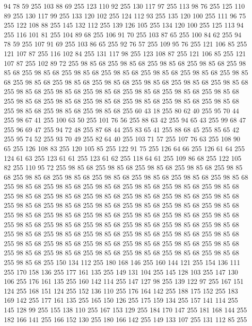 94 78 59 255 103 88 69 255 123 110 92 255 130 117 97 255 113 98 76 255 125 110 89 255 130 117 99 255 133 120 102 255 124 112 93 255 135 120 100 255 111 96 75 255 122 108 88 255 145 132 112 255 139 126 105 255 134 120 100 255 125 113 94 255 116 101 81 255 104 89 68 255 106 91 70 255 103 87 65 255 100 84 62 255 94 78 59 255 107 91 69 255 103 86 65 255 92 76 57 255 109 95 76 255 121 106 85 255 121 107 87 255 116 102 84 255 131 117 98 255 123 108 87 255 121 106 85 255 121 107 87 255 102 89 72 255 98 85 68 255 98 85 68 255 98 85 68 255 98 85 68 255 98 85 68 255 98 85 68 255 98 85 68 255 98 85 68 255 98 85 68 255 98 85 68 255 98 85 68 255 98 85 68 255 98 85 68 255 98 85 68 255 98 85 68 255 98 85 68 255 98 85 68 255 98 85 68 255 98 85 68 255 98 85 68 255 98 85 68 255 98 85 68 255 98 85 68 255 98 85 68 255 98 85 68 255 98 85 68 255 98 85 68 255 98 85 68 255 98 85 68 255 98 85 68 255
98 85 68 255 98 85 68 255 60 43 18 255 80 62 40 255 95 70 44 255 98 67 41 255 100 63 50 255 101 76 56 255 88 63 42 255 94 65 43 255 99 68 47 255 96 69 47 255 94 72 48 255 87 68 44 255 83 65 41 255 88 68 45 255 85 65 42 255 95 74 52 255 93 70 49 255 82 64 40 255 103 71 57 255 107 76 63 255 108 90 65 255 126 108 83 255 120 105 85 255 122 91 75 255 126 64 66 255 126 61 64 255 124 61 63 255 123 61 61 255 123 61 62 255 118 64 61 255 109 86 68 255 122 105 82 255 110 95 72 255 98 85 68 255 98 85 68 255 98 85 68 255 98 85 68 255 98 85 68 255 98 85 68 255 98 85 68 255 98 85 68 255 98 85 68 255 98 85 68 255 98 85 68 255 98 85 68 255 98 85 68 255 98 85 68 255 98 85 68 255 98 85 68 255 98 85 68 255 98 85 68 255 98 85 68 255 98 85 68 255 98 85 68 255 98 85 68 255 98 85 68 255 98 85 68 255 98 85 68 255 98 85 68 255 98 85 68 255 98 85 68 255 98 85 68 255
98 85 68 255 98 85 68 255 98 85 68 255 98 85 68 255 98 85 68 255 98 85 68 255 98 85 68 255 98 85 68 255 98 85 68 255 98 85 68 255 98 85 68 255 98 85 68 255 98 85 68 255 98 85 68 255 98 85 68 255 98 85 68 255 98 85 68 255 98 85 68 255 98 85 68 255 98 85 68 255 98 85 68 255 98 85 68 255 98 85 68 255 98 85 68 255 98 85 68 255 98 85 68 255 98 85 68 255 98 85 68 255 98 85 68 255 98 85 68 255 98 85 68 255 150 134 112 255 180 168 146 255 160 144 121 255 154 136 111 255 170 158 136 255 177 161 135 255 149 131 104 255 145 128 103 255 147 130 106 255 176 161 135 255 160 142 114 255 147 127 98 255 139 122 97 255 167 151 124 255 168 151 124 255 152 136 110 255 176 164 142 255 188 175 152 255 183 169 142 255 177 161 135 255 165 150 126 255 175 159 134 255 157 141 114 255 145 128 99 255 155 138 110 255 167 153 129 255 184 170 147 255 181 168 144 255 182 166 141 255 166 152 130 255 180 166 142 255 149 133 107 255 131 112 85 255
